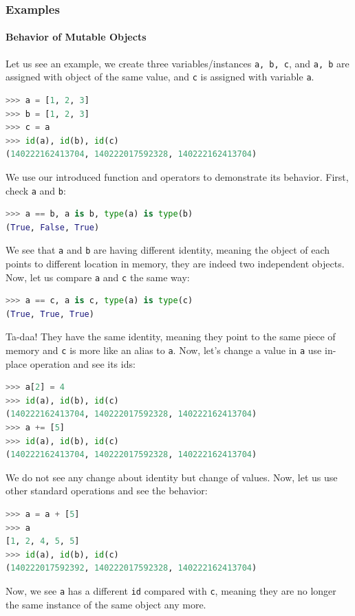 \documentclass[../main.tex]{subfiles}
\begin{document}
\subsubsection{Examples}
\paragraph{Behavior of Mutable Objects}
Let us see an example, we create three variables/instances \texttt{a, b, c}, and \texttt{a, b} are assigned with object of the same value, and \texttt{c} is assigned with variable \texttt{a}.
\begin{lstlisting}[language=Python]
>>> a = [1, 2, 3]
>>> b = [1, 2, 3]
>>> c = a
>>> id(a), id(b), id(c)
(140222162413704, 140222017592328, 140222162413704)
\end{lstlisting}
We use our introduced function and operators to demonstrate its behavior. First, check \texttt{a} and \texttt{b}:
\begin{lstlisting}[language=Python]
>>> a == b, a is b, type(a) is type(b)
(True, False, True)
\end{lstlisting}
We see that \texttt{a} and \texttt{b} are having different identity, meaning the object of each points to different location in memory, they are indeed two independent objects. Now, let us compare \texttt{a} and \texttt{c} the same way:
\begin{lstlisting}[language=Python]
>>> a == c, a is c, type(a) is type(c)
(True, True, True)
\end{lstlisting}
Ta-daa! They have the same identity, meaning they point to the same piece of memory and \texttt{c} is more like an alias to \texttt{a}. Now, let's change a value in \texttt{a} use in-place operation and see its ids:
\begin{lstlisting}[language=Python]
>>> a[2] = 4
>>> id(a), id(b), id(c)
(140222162413704, 140222017592328, 140222162413704)
>>> a += [5]
>>> id(a), id(b), id(c)
(140222162413704, 140222017592328, 140222162413704)
\end{lstlisting}
We do not see any change about identity but change of values. Now, let us use other standard operations and see the behavior:
\begin{lstlisting}[language=Python]
>>> a = a + [5]
>>> a
[1, 2, 4, 5, 5]
>>> id(a), id(b), id(c)
(140222017592392, 140222017592328, 140222162413704)
\end{lstlisting}
Now, we see \texttt{a} has a different \texttt{id} compared with \texttt{c}, meaning they are no longer the same instance of the same object any more.
\end{document}
